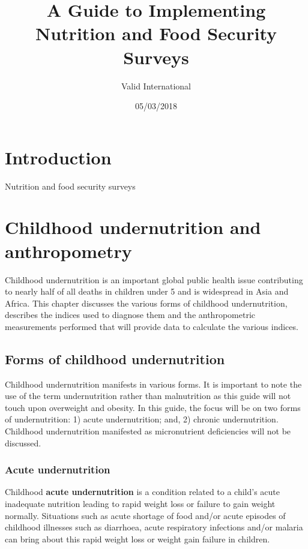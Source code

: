 \documentclass[12pt,]{book}
\title{A Guide to Implementing Nutrition and Food Security Surveys}
\author{Valid International}
\date{05/03/2018}
\theoremstyle{definition}
\theoremstyle{definition}
\theoremstyle{definition}
\theoremstyle{remark}
\begin{document}
\maketitle

{
\setcounter{tocdepth}{1}
\tableofcontents
}
\hypertarget{introduction}{%
\chapter{Introduction}\label{introduction}}

Nutrition and food security surveys

\hypertarget{anthro}{%
\chapter{Childhood undernutrition and anthropometry}\label{anthro}}

Childhood undernutrition is an important global public health issue
contributing to nearly half of all deaths in children under 5 and is
widespread in Asia and Africa. This chapter discusses the various forms
of childhood undernutrition, describes the indices used to diagnose them
and the anthropometric measurements performed that will provide data to
calculate the various indices.

\hypertarget{forms-of-childhood-undernutrition}{%
\section{Forms of childhood
undernutrition}\label{forms-of-childhood-undernutrition}}

Childhood undernutrition manifests in various forms. It is important to
note the use of the term undernutrition rather than malnutrition as this
guide will not touch upon overweight and obesity. In this guide, the
focus will be on two forms of undernutrition: 1) acute undernutrition;
and, 2) chronic undernutrition. Childhood undernutrition manifested as
micronutrient deficiencies will not be discussed.

\hypertarget{acute-undernutrition}{%
\subsection{Acute undernutrition}\label{acute-undernutrition}}

Childhood \textbf{acute undernutrition} is a condition related to a
child's acute inadequate nutrition leading to rapid weight loss or
failure to gain weight normally. Situations such as acute shortage of
food and/or acute episodes of childhood illnesses such as diarrhoea,
acute respiratory infections and/or malaria can bring about this rapid
weight loss or weight gain failure in children.
\end{document}
